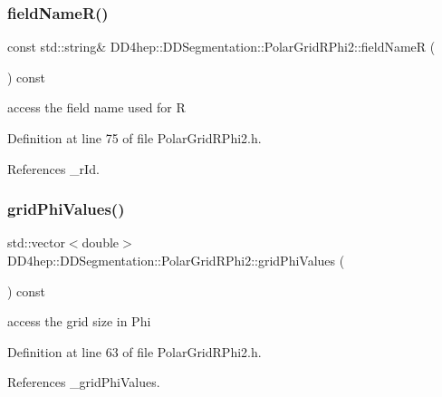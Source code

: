 \subsubsection{\texorpdfstring{field\+Name\+R()}{fieldNameR()}}
{\footnotesize\ttfamily const std\+::string\& D\+D4hep\+::\+D\+D\+Segmentation\+::\+Polar\+Grid\+R\+Phi2\+::field\+NameR (\begin{DoxyParamCaption}{ }\end{DoxyParamCaption}) const\hspace{0.3cm}{\ttfamily [inline]}}



access the field name used for R 



Definition at line 75 of file Polar\+Grid\+R\+Phi2.\+h.



References \+\_\+r\+Id.

\hypertarget{class_d_d4hep_1_1_d_d_segmentation_1_1_polar_grid_r_phi2_a946a7c5a55f8724236bdf3198929b130}{}\label{class_d_d4hep_1_1_d_d_segmentation_1_1_polar_grid_r_phi2_a946a7c5a55f8724236bdf3198929b130} 
\subsubsection{\texorpdfstring{grid\+Phi\+Values()}{gridPhiValues()}}
{\footnotesize\ttfamily std\+::vector$<$double$>$ D\+D4hep\+::\+D\+D\+Segmentation\+::\+Polar\+Grid\+R\+Phi2\+::grid\+Phi\+Values (\begin{DoxyParamCaption}{ }\end{DoxyParamCaption}) const\hspace{0.3cm}{\ttfamily [inline]}}



access the grid size in Phi 



Definition at line 63 of file Polar\+Grid\+R\+Phi2.\+h.



References \+\_\+grid\+Phi\+Values.

\hypertarget{class_d_d4hep_1_1_d_d_segmentation_1_1_polar_grid_r_phi2_a27be038b7d2501211c3a814016875daf}{}\label{class_d_d4hep_1_1_d_d_segmentation_1_1_polar_grid_r_phi2_a27be038b7d2501211c3a814016875daf} 
